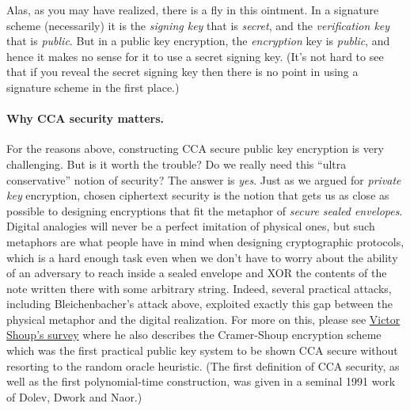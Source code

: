 
Alas, as you may have realized, there is a fly in this ointment. In a
signature scheme (necessarily) it is the \emph{signing key} that is
\emph{secret}, and the \emph{verification key} that is \emph{public}.
But in a public key encryption, the \emph{encryption} key is
\emph{public}, and hence it makes no sense for it to use a secret
signing key. (It's not hard to see that if you reveal the secret signing
key then there is no point in using a signature scheme in the first
place.)

\paragraph{Why CCA security matters.} For the reasons above,
constructing CCA secure public key encryption is very challenging. But
is it worth the trouble? Do we really need this ``ultra conservative''
notion of security? The answer is \emph{yes}. Just as we argued for
\emph{private key} encryption, chosen ciphertext security is the notion
that gets us as close as possible to designing encryptions that fit the
metaphor of \emph{secure sealed envelopes}. Digital analogies will never
be a perfect imitation of physical ones, but such metaphors are what
people have in mind when designing cryptographic protocols, which is a
hard enough task even when we don't have to worry about the ability of
an adversary to reach inside a sealed envelope and XOR the contents of
the note written there with some arbitrary string. Indeed, several
practical attacks, including Bleichenbacher's attack above, exploited
exactly this gap between the physical metaphor and the digital
realization. For more on this, please see
\href{http://www.shoup.net/papers/expo.pdf}{Victor Shoup's survey} where
he also describes the Cramer-Shoup encryption scheme which was the first
practical public key system to be shown CCA secure without resorting to
the random oracle heuristic. (The first definition of CCA security, as
well as the first polynomial-time construction, was given in a seminal
1991 work of Dolev, Dwork and Naor.)

